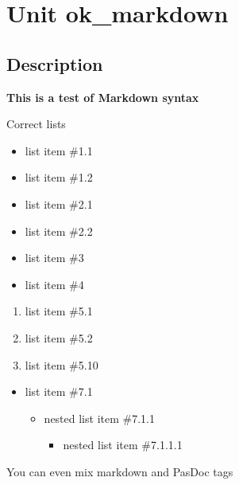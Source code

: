 \documentclass{report}
\begin{document}
\newlength{\tmplength}
\chapter{Unit ok{\_}markdown}
\section{Description}
\textbf{This is a test of Markdown syntax}\hfill\vspace*{1ex}

 Correct lists \begin{itemize}
\item list item {\#}1.1
\item list item {\#}1.2
\end{itemize}\begin{itemize}
\item list item {\#}2.1
\item list item {\#}2.2
\end{itemize}\begin{itemize}
\item list item {\#}3
\end{itemize}\begin{itemize}
\item list item {\#}4
\end{itemize}\begin{enumerate}
\setcounter{enumi}{0} \setcounter{enumii}{0} \setcounter{enumiii}{0} \setcounter{enumiv}{0} 
\item list item {\#}5.1
\setcounter{enumi}{1} \setcounter{enumii}{1} \setcounter{enumiii}{1} \setcounter{enumiv}{1} 
\item list item {\#}5.2
\setcounter{enumi}{2} \setcounter{enumii}{2} \setcounter{enumiii}{2} \setcounter{enumiv}{2} 
\item list item {\#}5.10
\end{enumerate}\begin{itemize}
\item list item {\#}7.1 \begin{itemize}
\item nested list item {\#}7.1.1 \begin{itemize}
\item nested list item {\#}7.1.1.1
\end{itemize}
\end{itemize}
\end{itemize}You can even mix markdown and PasDoc tags
\end{document}
